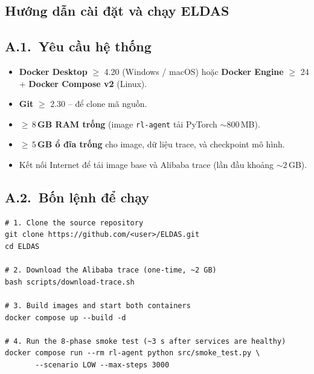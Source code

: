 \begin{appendices}

\chapter{Hướng dẫn cài đặt và chạy ELDAS}
\label{app:install}

\section*{A.1.\ Yêu cầu hệ thống}
\begin{itemize}
  \item \textbf{Docker Desktop} $\ge$ 4.20 (Windows / macOS) hoặc
        \textbf{Docker Engine} $\ge$ 24 + \textbf{Docker Compose
        v2} (Linux).
  \item \textbf{Git} $\ge$ 2.30 -- để clone mã nguồn.
  \item \textbf{$\ge\,8$\,GB RAM trống} (image \texttt{rl-agent}
        tải PyTorch $\sim 800$\,MB).
  \item \textbf{$\ge\,5$\,GB ổ đĩa trống} cho image, dữ liệu trace,
        và checkpoint mô hình.
  \item Kết nối Internet để tải image base và Alibaba trace
        (lần đầu khoảng $\sim 2$\,GB).
\end{itemize}

\section*{A.2.\ Bốn lệnh để chạy}

\begin{lstlisting}[style=yamlstyle,
  caption={Quy trình tối thiểu để dựng lại toàn bộ hệ thống.}]
# 1. Clone the source repository
git clone https://github.com/<user>/ELDAS.git
cd ELDAS

# 2. Download the Alibaba trace (one-time, ~2 GB)
bash scripts/download-trace.sh

# 3. Build images and start both containers
docker compose up --build -d

# 4. Run the 8-phase smoke test (~3 s after services are healthy)
docker compose run --rm rl-agent python src/smoke_test.py \
       --scenario LOW --max-steps 3000
\end{lstlisting}


\end{appendices}
